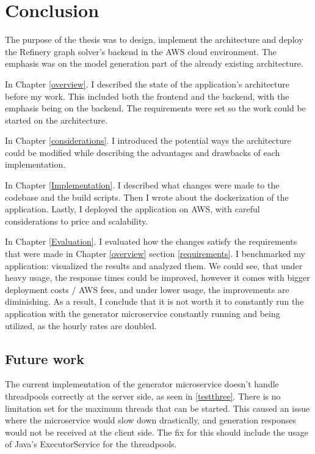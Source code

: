 \chapter{Conclusion} \label{Conclusion}

	The purpose of the thesis was to design, implement the architecture and deploy the Refinery graph solver's backend in the AWS cloud environment.
	The emphasis was on the model generation part of the already existing architecture.

	In Chapter \ref{overview}. I described the state of the application's architecture before my work. This included both the frontend and the backend, with
	the emphasis being on the backend. The requirements were set so the work could be started on the architecture.

	In Chapter \ref{considerations}. I introduced the potential ways the architecture could be modified while describing the advantages and drawbacks
	of each implementation.  

	In Chapter \ref{Implementation}. I described what changes were made to the codebase and the build scripts. Then I wrote about the dockerization 
	of the application. Lastly, I deployed the application on AWS, with careful considerations to price and scalability.

	In Chapter \ref{Evaluation}. I evaluated how the changes satisfy the requirements that were made in Chapter \ref{overview} section \ref{requirements}.
	I benchmarked
	my application: visualized the results and analyzed them. We could see, that under heavy usage, the response times could be improved, 
	however it comes with bigger deployment costs / AWS fees, and under lower usage, the improvements are diminishing. 
	As a result, I conclude that it is not worth it to constantly run the application with the 
	generator microservice constantly running and being utilized, as the hourly rates are doubled.

	\section{Future work}
		The current implementation of the generator microservice doesn't handle threadpools correctly at the server side, as seen in \ref{testthree}.
		There is no limitation set for the maximum threads that can be started.
		This caused an issue where the microservice would slow down drastically, and generation responses would not be received 
		at the client side. The fix for this should include the usage of Java's ExecutorService for the threadpools.

